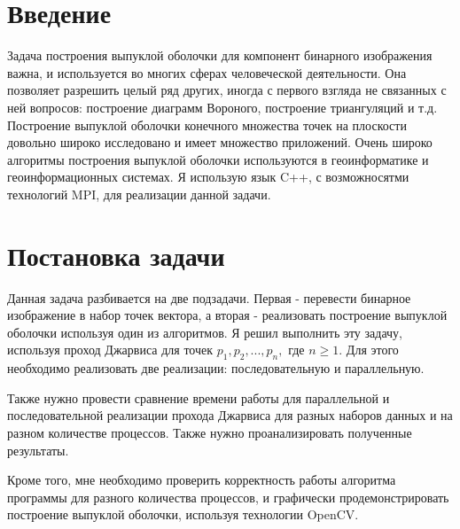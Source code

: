 \documentclass{report}
\begin{document}
\setcounter{page}{2}

\tableofcontents
\newpage

\section*{Введение}
Задача построения выпуклой оболочки для компонент бинарного изображения важна, и используется во многих сферах человеческой деятельности. Она позволяет разрешить целый ряд других, иногда с первого взгляда не связанных с ней вопросов: построение диаграмм Вороного, построение триангуляций и т.д. Построение выпуклой оболочки конечного множества точек на плоскости довольно широко исследовано и имеет множество приложений. Очень широко алгоритмы построения выпуклой оболочки используются в геоинформатике и геоинформационных системах. Я использую язык C++, с возможносятми технологий MPI, для реализации данной задачи.
\newpage

\section*{Постановка задачи}
Данная задача разбивается на две подзадачи. Первая - перевести бинарное изображение в набор точек вектора, а вторая -  реализовать построение выпуклой оболочки используя один из алгоритмов. Я решил выполнить эту задачу, используя проход Джарвиса для точек $p_1, p_2, ..., p_n,$ где $n \ge 1$. Для этого необходимо реализовать две реализации: последовательную и параллельную.
\par
Также нужно провести сравнение времени работы для параллельной и последовательной реализации прохода Джарвиса для разных наборов данных и на разном количестве процессов. Также нужно проанализировать полученные результаты.
\par
Кроме того, мне необходимо проверить корректность работы алгоритма программы для разного количества процессов, и графически продемонстрировать построение выпуклой оболочки, используя технологии OpenCV. 
\newpage

\end{document}
